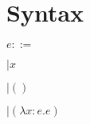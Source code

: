 \documentclass{article}
\begin{document}
\newcommand{\lam}[2]{\lambda #1. #2}

\section{Syntax}

$e ::=$

$| x$

$| ()$

$| (\lam{x : e}{e})$
\end{document}
